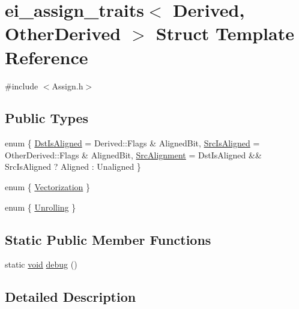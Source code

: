 \hypertarget{structei__assign__traits}{\section{ei\-\_\-assign\-\_\-traits$<$ Derived, Other\-Derived $>$ Struct Template Reference}
\label{structei__assign__traits}
}


{\ttfamily \#include $<$Assign.\-h$>$}

\subsection*{Public Types}
\begin{DoxyCompactItemize}
\item 
enum \{ \hyperlink{structei__assign__traits_adb76bc7019909f60a44d8c2711217dd6a8a8e85068577b3ba4e30e01580553190}{Dst\-Is\-Aligned} = Derived\-:\-:Flags \& Aligned\-Bit, 
\hyperlink{structei__assign__traits_adb76bc7019909f60a44d8c2711217dd6af74e9b9d9671572056d8db8e0a64bbf0}{Src\-Is\-Aligned} = Other\-Derived\-:\-:Flags \& Aligned\-Bit, 
\hyperlink{structei__assign__traits_adb76bc7019909f60a44d8c2711217dd6a1dfdd57f6e3f9359556f3b15ac5f2f0c}{Src\-Alignment} = Dst\-Is\-Aligned \&\& Src\-Is\-Aligned ? Aligned \-: Unaligned
 \}
\item 
enum \{ \hyperlink{structei__assign__traits_ac1a4600997e18e41b5bb63318a19f25ba2542ac1ebcb19cf17e3274b6faabeab1}{Vectorization}
 \}
\item 
enum \{ \hyperlink{structei__assign__traits_a6c8bcbf7c2c8e287c2c52b4e01f0c8caac94f4e3749ec7e4ddb82e1cb0962c355}{Unrolling}
 \}
\end{DoxyCompactItemize}
\subsection*{Static Public Member Functions}
\begin{DoxyCompactItemize}
\item 
static \hyperlink{group___u_a_v_objects_plugin_ga444cf2ff3f0ecbe028adce838d373f5c}{void} \hyperlink{structei__assign__traits_a1a0416c3056661c715e387a88642c967}{debug} ()
\end{DoxyCompactItemize}


\subsection{Detailed Description}
